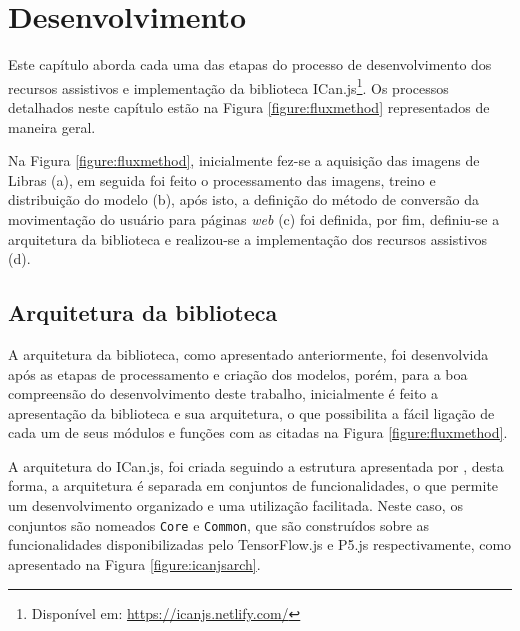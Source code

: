 \newpage
\chapter{Desenvolvimento}
\label{ch:desenvolvimento}

\par Este capítulo aborda cada uma das etapas do processo de desenvolvimento dos recursos assistivos e implementação da biblioteca ICan.js\footnote{Disponível em: \url{https://icanjs.netlify.com/}}. Os processos detalhados neste capítulo estão na Figura \ref{figure:fluxmethod} representados de maneira geral.


\par Na Figura \ref{figure:fluxmethod}, inicialmente fez-se a aquisição das imagens de Libras (a), em seguida foi feito o processamento das imagens, treino e distribuição do modelo (b), após isto, a definição do método de conversão da movimentação do usuário para páginas \textit{web} (c) foi definida, por fim, definiu-se a arquitetura da biblioteca e realizou-se a implementação dos recursos assistivos (d).

\section{Arquitetura da biblioteca}

\par A arquitetura da biblioteca, como apresentado anteriormente, foi desenvolvida após as etapas de processamento e criação dos modelos, porém, para a boa compreensão do desenvolvimento deste trabalho, inicialmente é feito a apresentação da biblioteca e sua arquitetura, o que possibilita a fácil ligação de cada um de seus módulos e funções com as citadas na Figura \ref{figure:fluxmethod}.

\par A arquitetura do ICan.js, foi criada seguindo a estrutura apresentada por , desta forma, a arquitetura é separada em conjuntos de funcionalidades, o que permite um desenvolvimento organizado e uma utilização facilitada. Neste caso, os conjuntos são nomeados \texttt{Core} e \texttt{Common}, que são construídos sobre as funcionalidades disponibilizadas pelo TensorFlow.js e P5.js respectivamente, como apresentado na Figura \ref{figure:icanjsarch}.

